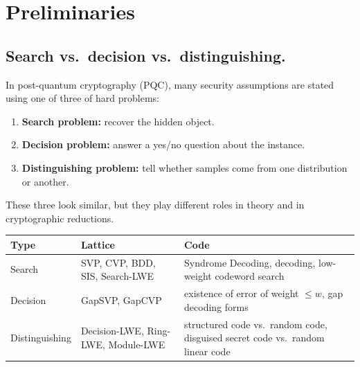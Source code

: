 \chapter{Preliminaries}

\section{Search vs.\ decision vs.\ distinguishing.}
In post-quantum cryptography (PQC), many security assumptions are stated using one of three of hard problems:

\begin{enumerate}[label=\arabic*.]
	\item \textbf{Search problem:} recover the hidden object.
	\item \textbf{Decision problem:} answer a yes/no question about the instance.
	\item \textbf{Distinguishing problem:} tell whether samples come from one distribution or another.
\end{enumerate}
These three look similar, but they play different roles in theory and in cryptographic reductions.

\begin{center}
	\renewcommand{\arraystretch}{1.35}
	\begin{tabular}{p{2.6cm}p{4.4cm}p{8.75cm}}
		\toprule[1.2pt]
		\textbf{Type}& \textbf{Lattice} & \textbf{Code} \\
		\midrule
		Search & SVP, CVP, BDD, SIS, Search-LWE & Syndrome Decoding, decoding, low-weight codeword search \\
		\midrule
		Decision & GapSVP, GapCVP & existence of error of weight $\le w$, gap decoding forms \\
		\midrule
		Distinguishing & Decision-LWE, Ring-LWE, Module-LWE & structured code vs.\ random code, disguised secret code vs.\ random linear code \\
		\bottomrule[1.2pt]
	\end{tabular}
\end{center}

